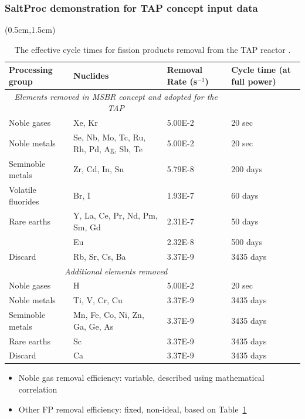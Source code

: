 \begin{frame}
\frametitle{SaltProc demonstration for TAP concept input data}
	  \begin{textblock*}{12.5cm}(0.5cm,1.5cm) %
\begin{table}[htbp!]
	\fontsize{6}{9}\selectfont
	\centering
	\caption{The effective cycle times for fission products removal  from the 
		\gls{TAP} reactor \cite{betzler_implementation_2017}.}
	\begin{tabular}{p{} p{} p{} 
			p{}}
		\hline 
		\textbf{Processing group} & \qquad\qquad\qquad \textbf{Nuclides} & 
		\textbf{Removal Rate (s$^{-1}$)} & \textbf{Cycle time (at full power)} 
		\\ \hline 
		\multicolumn{3}{c}{\textit{Elements removed in \gls{MSBR} concept and 
				adopted for the \gls{TAP}} \cite{robertson_conceptual_1971}} \\
		Noble gases & Xe, Kr								  & 5.00E-2 & 20 
		sec \\
		Noble metals & Se, Nb, Mo, Tc, Ru, Rh, Pd, Ag, Sb, Te & 5.00E-2 & 20 
		sec \\
		Seminoble metals & Zr, Cd, In, Sn	  				  & 5.79E-8 & 200 
		days\\
		Volatile fluorides & Br, I 							  & 1.93E-7 & 60 
		days\\
		Rare earths & Y, La, Ce, Pr, Nd, Pm, Sm, Gd           & 2.31E-7 & 50 
		days\\
		\qquad & Eu & 2.32E-8 & 500 days \\
		Discard & Rb, Sr, Cs, Ba & 3.37E-9 & 3435 days \\
		\hline
		\multicolumn{3}{c}{\textit{Additional elements removed} 
			\cite{betzler_implementation_2017, 
			transatomic_power_corporation_neutronics_2016}} \\
		Noble gases & H								  	& 5.00E-2 & 20 
		sec    \\
		Noble metals & Ti, V, Cr, Cu						& 3.37E-9 & 3435 
		days \\
		Seminoble metals & Mn, Fe, Co, Ni, Zn, Ga, Ge, As   & 3.37E-9 & 3435 
		days \\
		Rare earths & Sc									& 3.37E-9 & 3435 
		days \\
		Discard & Ca										& 3.37E-9 & 3435 
		days \\
		\hline
	\end{tabular}
	\label{tab:reprocessing_list}
\end{table}
	\begin{itemize}
		\item Noble gas removal efficiency: variable, described using 
		mathematical 
		correlation
		\item Other FP removal efficiency: fixed, non-ideal, based on 
		Table~\ref{tab:reprocessing_list}
	\end{itemize}
	\end{textblock*}
\end{frame}


